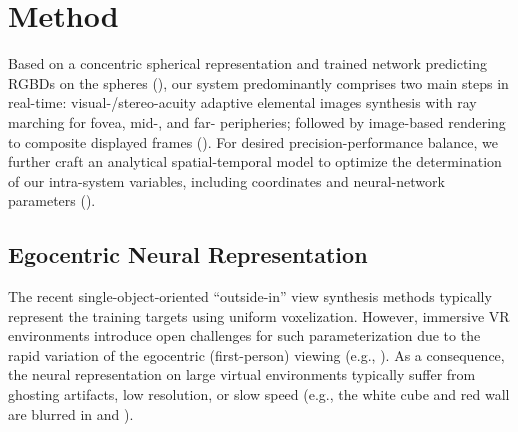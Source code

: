 \section{Method}
\label{sec:method}
 Based on a concentric spherical representation and trained network predicting RGBDs on the spheres (), our system predominantly comprises two main steps in real-time: visual-/stereo-acuity adaptive elemental images synthesis with ray marching for fovea, mid-, and far- peripheries; followed by image-based rendering to composite displayed frames ().
For desired precision-performance balance, we further craft an analytical spatial-temporal model to optimize the determination of our intra-system variables, including coordinates and neural-network parameters ().

\subsection{Egocentric Neural Representation}
\label{sec:method:representation}
The recent single-object-oriented ``outside-in'' view synthesis methods \cite{sitzmann2019deepvoxels,mildenhall2020nerf} typically represent the training targets using uniform voxelization. However, immersive VR environments introduce open challenges for such parameterization due to the rapid variation of the egocentric (first-person) viewing (e.g., ).
As a consequence, the neural representation on large virtual environments typically suffer from ghosting artifacts, low resolution, or slow speed (e.g., the white cube and red wall are blurred in  and ).
